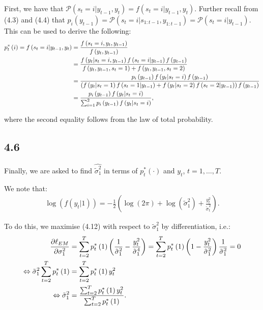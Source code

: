 \documentclass[11pt,a4paper,oneside]{article}
\newcommand{\LL}{\Leftrightarrow}
\newcommand{\lp}{\left(}
\newcommand{\rp}{\right)}
\newcommand{\pp}{\mathcal{P}}
\begin{document}
First, we have that $\pp\lp s_t = i \vert y_{t-1}, y_t\rp = f\lp s_t = i\vert y_{t-1}, y_t\rp$. Further recall from (4.3) and (4.4) that $p_i \lp y_{t-1}\rp = \pp\lp s_t = i \vert s_{1:t-1}, y_{1:t-1}\rp = \pp\lp s_t = i \vert y_{t-1}\rp$. This can be used to derive the following:
\begin{align}
    p_t^*\lp i\rp = f\lp s_t = i\vert y_{t-1}, y_t\rp 
        &= \frac{f\lp s_t = i, y_t, y_{t-1}\rp}{f\lp y_t, y_{t-1}\rp} \notag \\
        &= \frac{f\lp y_t \vert s_t = i, y_{t-1}\rp f\lp s_t = i \vert y_{t-1}\rp f\lp y_{t-1}\rp }{f\lp y_t, y_{t-1}, s_t = 1\rp + f\lp y_t, y_{t-1}, s_t = 2\rp} \notag \\
        &= \frac{p_i\lp y_{t-1}\rp f\lp y_t \vert s_t = i\rp f\lp y_{t-1}\rp}{\lp f\lp y_t \vert s_t = 1\rp f\lp s_t = 1\vert y_{t-1}\rp + f\lp y_t \vert s_t = 2\rp f\lp s_t = 2 \vert y_{t-1}\rp \rp f\lp y_{t-1}\rp} \notag \\
        &= \frac{p_i\lp y_{t-1}\rp f\lp y_t \vert s_t = i\rp}{\sum_{i=1}^2 p_i\lp y_{t-1}\rp f\lp y_t \vert s_t = i \rp},
\end{align}

where the second equality follows from the law of total probability.

\subsection{4.6}
Finally, we are asked to find $\hat{\tilde \sigma_1^2}$ in terms of $p_t^*\lp \cdot \rp$ and $y_t$, $t = 1, \dots, T$.

We note that:
\begin{align}
    \log \lp f\lp y_t \vert 1\rp\rp = - \frac{1}{2}\lp \log \lp 2 \pi\rp + \log \lp \tilde \sigma_1^2 \rp + \frac{y_t^2}{\tilde \sigma_t^2}\rp.
\end{align}

To do this, we maximise (4.12) with respect to $\tilde \sigma_1^2$ by differentiation, i.e.:
\begin{align}
    \frac{\partial \ell_{EM}}{\partial \sigma_1^2}
        &= \sum_{t=2}^T p_t^*\lp 1\rp \lp \frac{1}{\tilde \sigma_1^2} - \frac{y_t^2}{\tilde \sigma_1^4}\rp 
        = \sum_{t=2}^T p_t^*\lp 1\rp \lp 1 - \frac{y_t^2}{\tilde \sigma_1^2}\rp\frac{1}{\tilde \sigma_1^2} 
        = 0 \notag \\
    \LL \tilde \sigma_1^2 \sum_{t=2}^T p_t^*\lp 1\rp &= \sum_{t=2}^T p_t^*\lp 1\rp y_t^2 \notag \\
    \LL \tilde \sigma_1^2 
    &= \frac{\sum_{t=2}^T p_t^*\lp 1\rp y_t^2}{\sum_{t=2}^T p_t^*\lp 1\rp}.
\end{align}
\end{document}
